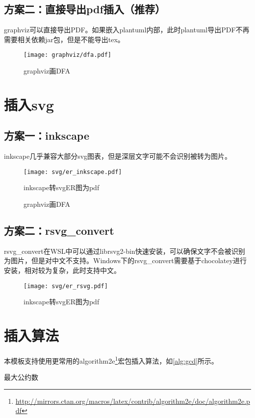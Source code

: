 \subsection{方案二：直接导出pdf插入（推荐）}
\par graphviz可以直接导出PDF。如果嵌入plantuml内部，此时plantuml导出PDF不再需要相关依赖jar包，但是不能导出tex。
\begin{figure}[htbp]
    \centering
    \texttt{[image: graphviz/dfa.pdf]}
    \caption{graphviz画DFA}
    \label{fig:graphviz_pdf}
\end{figure}
\section{插入svg}
\subsection{方案一：inkscape}
\par inkscape几乎兼容大部分svg图表，但是深层文字可能不会识别被转为图片。
\begin{figure}[htbp]
    \centering
    \texttt{[image: svg/er\_inkscape.pdf]}
    \caption{inkscape转svgER图为pdf}
    \label{fig:svg_pdf}
\end{figure}
\begin{figure}[htbp]
    \centering
    \resizebox{0.8\textwidth}{!}{}
    \caption{graphviz画DFA}
    \label{fig:svg_tex}
\end{figure}
\subsection{方案二：rsvg\_convert}
\par rsvg\_convert在WSL中可以通过librsvg2-bin快速安装，可以确保文字不会被识别为图片，但是对中文不支持。Windows下的rsvg\_convert需要基于chocolatey进行安装，相对较为复杂，此时支持中文。
\begin{figure}[htbp]
    \centering
    \texttt{[image: svg/er\_rsvg.pdf]}
    \caption{inkscape转svgER图为pdf}
    \label{fig:svg_pdf_chocolatey}
\end{figure}
\section{插入算法}
\par 本模板支持使用更常用的algorithm2e\footnote{\url{http://mirrors.ctan.org/macros/latex/contrib/algorithm2e/doc/algorithm2e.pdf}}宏包插入算法，如\cref{alg:gcd}所示。
\begin{algorithm}[htbp]
    \caption{最大公约数}
    \label{alg:gcd}
    \begin{small}
        \SetAlgoLined
        \;
    \end{small}
\end{algorithm}
